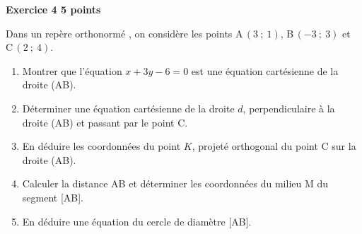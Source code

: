 \textbf{\large Exercice 4 \hfill 5 points}

\bigskip

Dans un repère orthonormé \Oij{}, on considère les points A\,$(3~;~1)$, B\,$(-3~;~3)$ et C\,$(2~;~4)$.

\begin{enumerate}
\item Montrer que l'équation $x + 3y - 6 = 0$ est une équation cartésienne de la droite (AB).
\item Déterminer une équation cartésienne de la droite $d$, perpendiculaire à la droite (AB) et
passant par le point C.
\item En déduire les coordonnées du point $K$, projeté orthogonal du point C sur la droite (AB).
\item Calculer la distance AB et déterminer les coordonnées du milieu M du segment [AB].
\item En déduire une équation du cercle de diamètre [AB].
\end{enumerate}
